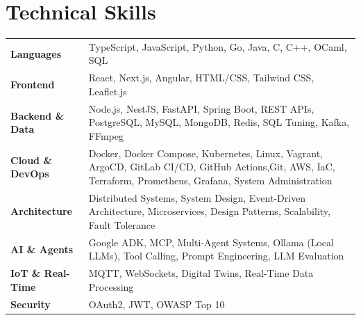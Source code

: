 \documentclass[10pt,a4paper]{article}
\begin{document}
\section{Technical Skills}

{\small
\renewcommand{\arraystretch}{1.02}
\begin{tabularx}{\linewidth}{@{} >{\bfseries}l X @{}}
  Languages           & TypeScript, JavaScript, Python, Go, Java, C, C++, OCaml, SQL \\
  Frontend            & React, Next.js, Angular, HTML/CSS, Tailwind CSS, Leaflet.js \\
  Backend \& Data     & Node.js, NestJS, FastAPI, Spring Boot, REST APIs, PostgreSQL, MySQL, MongoDB, Redis, SQL Tuning, Kafka, FFmpeg \\
  Cloud \& DevOps     & Docker, Docker Compose, Kubernetes, Linux, Vagrant, ArgoCD, GitLab CI/CD, GitHub Actions,\newline Git, AWS, IaC, Terraform, Prometheus, Grafana, System Administration \\
  Architecture        & Distributed Systems, System Design, Event-Driven Architecture, Microservices, Design Patterns, Scalability, Fault Tolerance \\
  AI \& Agents        & Google ADK, MCP, Multi-Agent Systems, Ollama (Local LLMs), Tool Calling, Prompt Engineering, LLM Evaluation \\
  IoT \& Real-Time    & MQTT, WebSockets, Digital Twins, Real-Time Data Processing \\
  Security            & OAuth2, JWT, OWASP Top 10 \\
\end{tabularx}
}
\end{document}

